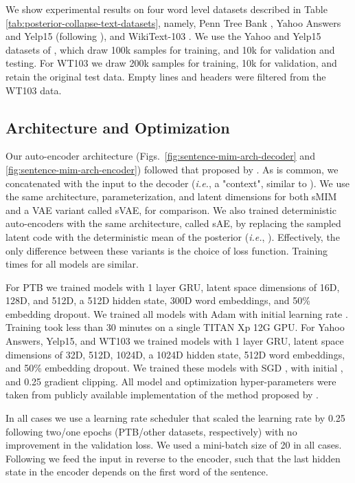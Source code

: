 \documentclass{article}
\newcommand{\ie}{{\em i.e.}}
\begin{document}
We show experimental results on four word level datasets
described in Table \ref{tab:posterior-collapse-text-datasets}, namely,
Penn Tree Bank \cite{Marcus:1993:BLA:972470.972475},
Yahoo Answers and Yelp15 (following \citet{DBLP:journals/corr/YangHSB17}),
and WikiText-103 \cite{DBLP:journals/corr/MerityXBS16}.
We use  the Yahoo and Yelp15 datasets of \citet{DBLP:journals/corr/YangHSB17}, 
which draw 100k samples for training, and 10k for validation and testing.
For WT103 we draw 200k samples for training, 10k for validation, and retain the original test data. 
Empty lines and headers were filtered from the WT103 data.

\subsection{Architecture and Optimization} \label{sec:nlp-architecture}

Our auto-encoder architecture (Figs.\ \ref{fig:sentence-mim-arch-decoder} and \ref{fig:sentence-mim-arch-encoder}) 
followed that proposed by \citet{DBLP:journals/corr/BowmanVVDJB15}.
As is common, we concatenated  with the input to the decoder 
(\ie, a "context", similar to \citet{he2018lagging,DBLP:journals/corr/YangHSB17,DBLP:journals/corr/BowmanVVDJB15}).
We use the same architecture, parameterization, and latent dimensions for both sMIM and a VAE 
variant called sVAE, for comparison. 
We also trained deterministic auto-encoders with the same architecture, called sAE,
by replacing the sampled latent code with the deterministic mean of the posterior (\ie, ).
Effectively, the only difference between these variants is the choice of loss function. Training times for all models are similar.

For PTB we trained models with 1 layer GRU, latent space dimensions of 16D, 128D, and 512D, 
a 512D hidden state, 300D word embeddings, and 50\% embedding dropout.
We trained all models with Adam \citep{Kingma2014} with initial learning rate . 
Training took less than 30 minutes on a single TITAN Xp 12G GPU.
For Yahoo Answers, Yelp15, and WT103 we trained models with 1 layer GRU, 
latent space dimensions of 32D, 512D, 1024D, a 1024D hidden state, 512D word embeddings, 
and 50\% embedding dropout.
We trained these models with SGD \citep{pmlr-v28-sutskever13}, with initial ,
and 0.25  gradient clipping.
All model and optimization hyper-parameters were taken from publicly available implementation of the method proposed by \citet{DBLP:journals/corr/BowmanVVDJB15}.

In all cases we use a learning rate scheduler that scaled the learning rate by 0.25
following two/one epochs (PTB/other datasets, respectively) with no improvement in
the validation loss.
We used a mini-batch size of 20 in all cases.
Following \cite{Sutskever:2014:SSL:2969033.2969173} we feed the input in reverse 
to the encoder, such that the last hidden state in the encoder depends on the 
first word of the sentence. 
\end{document}
